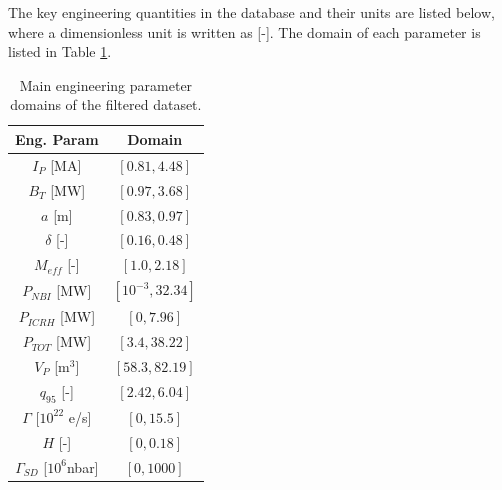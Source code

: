 \documentclass[a4paper, twoside, final, 12pt]{article}
\begin{document}
The key engineering quantities in the database and their units are listed below, where a dimensionless unit is written as [-]. The domain of each parameter is listed in Table \ref{tab:main_domain}. 

\begin{table}
\centering
\caption{Main engineering parameter domains of the filtered dataset.}
\label{tab:main_domain}
\begin{tabular}{| c | c | }
	\hline
	Eng. Param & Domain \\
	\hline
	$I_P$ [MA] & $[0.81, 4.48]$ \\
	$B_T$ [MW] & $[0.97, 3.68]$ \\
	$a$ [m] & $[0.83, 0.97]$ \\
	$\delta$ [-] & $[0.16, 0.48]$ \\
	$M_{eff}$ [-] & $[1.0, 2.18]$ \\
	$P_{NBI}$ [MW] & $[10^{-3}, 32.34]$ \\
	$P_{ICRH}$ [MW] & $[0, 7.96]$ \\
	$P_{TOT}$ [MW] & $[3.4, 38.22]$ \\
	$V_P$ [m$^3$] &  $[58.3, 82.19]$ \\
	$q_{95}$ [-] & $[2.42, 6.04]$ \\
	$\Gamma$ [$10^{22}$ e/s] & $[0, 15.5]$ \\
	$H$ [-] & $[0, 0.18]$ \\
	$\Gamma_{SD}$ [$10^6$nbar] & $[0,1000]$ \\
	\hline
\end{tabular}
\end{table}
\end{document}

